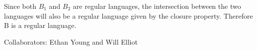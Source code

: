 \documentclass[11pt]{article}
\begin{document}
\begin{enumerate}
\newline Since both $B_{1}$ and $B_{2}$ are regular languages, the intersection between the two languages will also be a regular language given by the closure property. Therefore B is a regular language. 

Collaborators: Ethan Young and Will Elliot

\end{enumerate}
\end{document}
